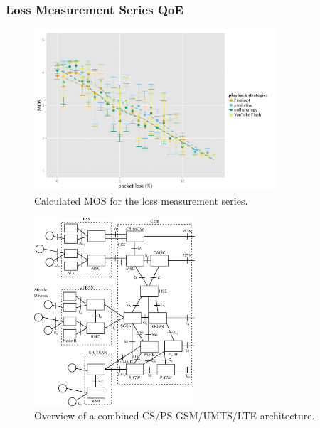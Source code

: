 \documentclass{beamer}
\begin{document}
\begin{frame}
	\frametitle{Loss Measurement Series QoE}

	\begin{figure}
		\centering
		\includegraphics[height=6cm]{../../chapters/03-streaming/images/R-playbackemulation-qoe-loss.pdf}
		\caption{Calculated MOS for the loss measurement series.}
	\end{figure}
\end{frame}





\begin{frame}
	\begin{figure}
		\centering
		\includegraphics[height=7cm]{../../chapters/04-mobilenets/images/3gpp-physical-arch.pdf}
		\caption{Overview of a combined CS/PS GSM/UMTS/LTE architecture.}
	\end{figure}
\end{frame}
\end{document}
